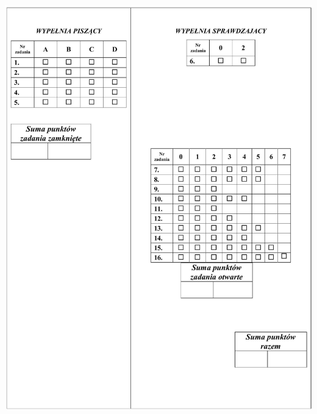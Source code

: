 \documentclass[10pt]{article}
\begin{document}
\begin{center}
\includegraphics[max width=\textwidth]{2024_11_21_498389c978c770348ebcg-16}
\end{center}
\end{document}
